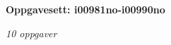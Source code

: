 \centerline{\bf Oppgavesett: i00981no-i00990no}
\vskip 10pt
\centerline{\it 10 oppgaver}\vskip 10pt
\vskip 10pt
